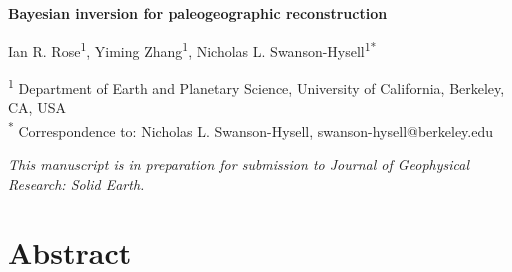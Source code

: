 \documentclass[11pt,letterpaper]{article}
\begin{document}
\begin{flushleft}
{\Large \textbf{Bayesian inversion for paleogeographic reconstruction}}

Ian R. Rose\textsuperscript{1},
Yiming Zhang\textsuperscript{1},
Nicholas L. Swanson-Hysell\textsuperscript{1}\textsuperscript{*}

\bigskip
\textsuperscript{1} Department of Earth and Planetary Science, University of California, Berkeley, CA, USA\\
\textsuperscript{*} Correspondence to: Nicholas L. Swanson-Hysell, swanson-hysell@berkeley.edu
\bigskip

\end{flushleft}

\noindent\textit{This manuscript is in preparation for submission to Journal of Geophysical Research: Solid Earth.}

\linenumbers

\section*{Abstract \label{sec:ABSTRACT}}
\end{document}
